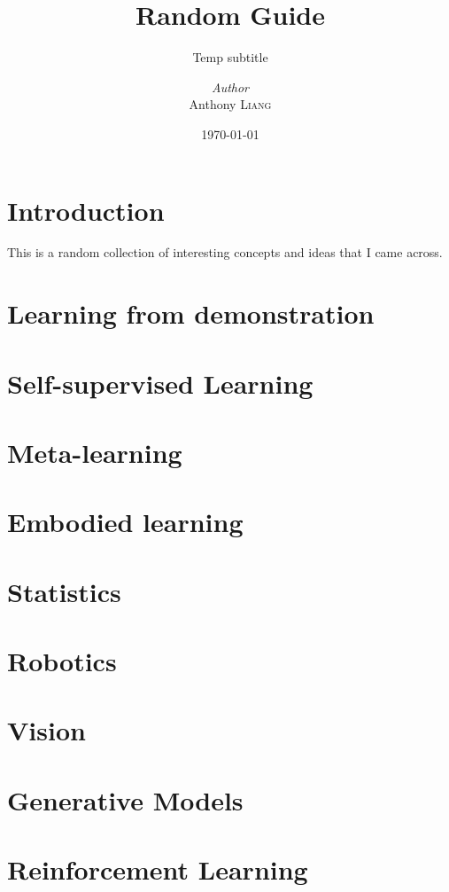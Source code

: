 \documentclass[a4paper, 12pt]{report}
\title{Random Guide}
\subtitle{Temp subtitle}
\author{\textit{Author}\\Anthony \textsc{Liang}}
\date{\today}
\begin{document}
    \maketitle
    \romantableofcontents

    \chapter{Introduction}

    This is a random collection of interesting concepts and ideas that I came across.

    \chapter{Learning from demonstration}

    \chapter{Self-supervised Learning}

    \chapter{Meta-learning}

    \chapter{Embodied learning}

    \chapter{Statistics}

    \chapter{Robotics}

    \chapter{Vision}

    

    \chapter{Generative Models}

    \chapter{Reinforcement Learning}
\end{document}

